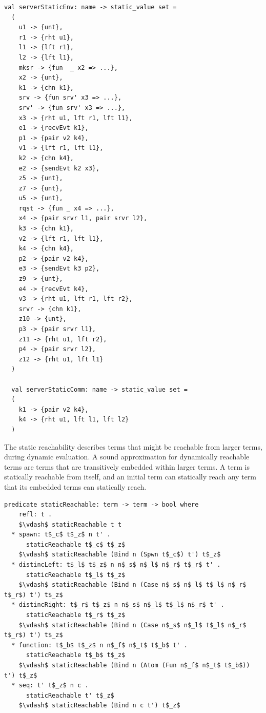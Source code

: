 \documentclass[letterpaper, 11pt]{report}
\begin{document}
\begin{lstlisting}[language=sugar_lang, mathescape]
  val serverStaticEnv: name -> static_value set =
  (
    u1 -> {unt},
    r1 -> {rht u1},
    l1 -> {lft r1},
    l2 -> {lft l1},
    mksr -> {fun  _ x2 => ...},
    x2 -> {unt},
    k1 -> {chn k1},
    srv -> {fun srv' x3 => ...},
    srv' -> {fun srv' x3 => ...},
    x3 -> {rht u1, lft r1, lft l1},
    e1 -> {recvEvt k1},
    p1 -> {pair v2 k4},
    v1 -> {lft r1, lft l1},
    k2 -> {chn k4},
    e2 -> {sendEvt k2 x3},
    z5 -> {unt},
    z7 -> {unt},
    u5 -> {unt},
    rqst -> {fun _ x4 => ...},
    x4 -> {pair srvr l1, pair srvr l2},
    k3 -> {chn k1},
    v2 -> {lft r1, lft l1},
    k4 -> {chn k4},
    p2 -> {pair v2 k4},
    e3 -> {sendEvt k3 p2},
    z9 -> {unt},
    e4 -> {recvEvt k4},
    v3 -> {rht u1, lft r1, lft r2},
    srvr -> {chn k1},
    z10 -> {unt},
    p3 -> {pair srvr l1},
    z11 -> {rht u1, lft r2},
    p4 -> {pair srvr l2},
    z12 -> {rht u1, lft l1}
  )

  val serverStaticComm: name -> static_value set =
  (
    k1 -> {pair v2 k4},
    k4 -> {rht u1, lft l1, lft l2}
  )
\end{lstlisting}

The static reachability describes terms that might be reachable from larger
terms, during dynamic evaluation.
A sound approximation for dynamically reachable terms are
terms that are transitively embedded within larger terms.
A term is statically reachable from itself,
and an initial term can statically reach any term that its embedded terms can statically reach.

\begin{lstlisting}[language=logic, mathescape]
  predicate staticReachable: term -> term -> bool where
    refl: t .
    $\vdash$ staticReachable t t 
  * spawn: t$_c$ t$_z$ n t' . 
      staticReachable t$_c$ t$_z$
    $\vdash$ staticReachable (Bind n (Spwn t$_c$) t') t$_z$
  * distincLeft: t$_l$ t$_z$ n n$_s$ n$_l$ n$_r$ t$_r$ t' . 
      staticReachable t$_l$ t$_z$
    $\vdash$ staticReachable (Bind n (Case n$_s$ n$_l$ t$_l$ n$_r$ t$_r$) t') t$_z$
  * distincRight: t$_r$ t$_z$ n n$_s$ n$_l$ t$_l$ n$_r$ t' . 
      staticReachable t$_r$ t$_z$
    $\vdash$ staticReachable (Bind n (Case n$_s$ n$_l$ t$_l$ n$_r$ t$_r$) t') t$_z$
  * function: t$_b$ t$_z$ n n$_f$ n$_t$ t$_b$ t' . 
      staticReachable t$_b$ t$_z$
    $\vdash$ staticReachable (Bind n (Atom (Fun n$_f$ n$_t$ t$_b$)) t') t$_z$
  * seq: t' t$_z$ n c . 
      staticReachable t' t$_z$
    $\vdash$ staticReachable (Bind n c t') t$_z$
\end{lstlisting}
\end{document}
